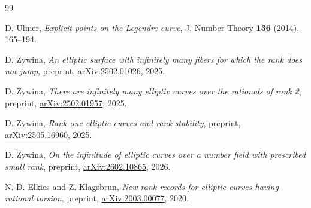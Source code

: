 \documentclass[12pt]{amsart}
\theoremstyle{plain}
\begin{document}
\newpage
\begin{thebibliography}{99}

D. Ulmer, \emph{Explicit points on the Legendre curve},
J. Number Theory \textbf{136} (2014), 165--194.

D. Zywina, \emph{An elliptic surface with infinitely many fibers for which the rank does not jump},
preprint, \href{https://arxiv.org/abs/2502.01026}{arXiv:2502.01026}, 2025.

D. Zywina, \emph{There are infinitely many elliptic curves over the rationals of rank 2},
preprint, \href{https://arxiv.org/abs/2502.01957}{arXiv:2502.01957}, 2025.

D. Zywina, \emph{Rank one elliptic curves and rank stability},
preprint, \href{https://arxiv.org/abs/2505.16960}{arXiv:2505.16960}, 2025.

D. Zywina, \emph{On the infinitude of elliptic curves over a number field with prescribed small rank},
preprint, \href{https://arxiv.org/abs/2602.10865}{arXiv:2602.10865}, 2026.

N. D. Elkies and Z. Klagsbrun, \emph{New rank records for elliptic curves having rational torsion},
preprint, \href{https://arxiv.org/abs/2003.00077}{arXiv:2003.00077}, 2020.

\end{thebibliography}
\end{document}
